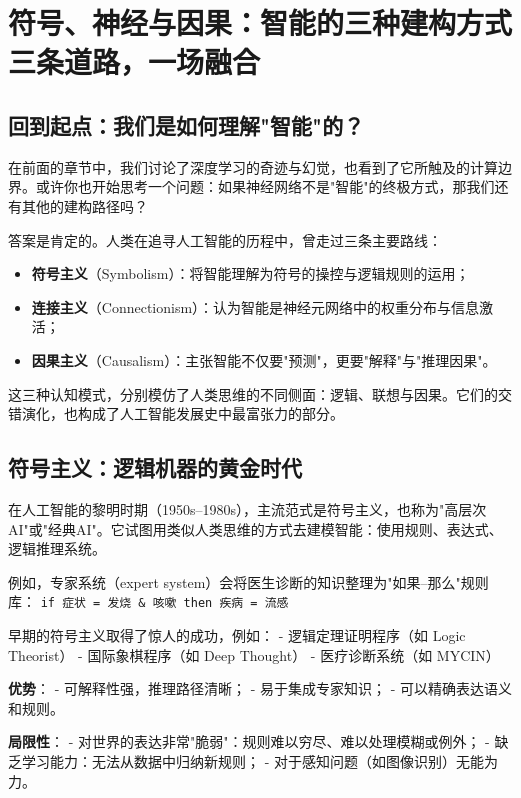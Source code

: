 \chapter{符号、神经与因果：智能的三种建构方式 \texorpdfstring{\\}{ } 三条道路，一场融合}
\section*{回到起点：我们是如何理解"智能"的？}

在前面的章节中，我们讨论了深度学习的奇迹与幻觉，也看到了它所触及的计算边界。或许你也开始思考一个问题：如果神经网络不是"智能"的终极方式，那我们还有其他的建构路径吗？

答案是肯定的。人类在追寻人工智能的历程中，曾走过三条主要路线：
\begin{itemize}
\item \textbf{符号主义}（Symbolism）：将智能理解为符号的操控与逻辑规则的运用；
\item \textbf{连接主义}（Connectionism）：认为智能是神经元网络中的权重分布与信息激活；
\item \textbf{因果主义}（Causalism）：主张智能不仅要"预测"，更要"解释"与"推理因果"。
\end{itemize}

这三种认知模式，分别模仿了人类思维的不同侧面：逻辑、联想与因果。它们的交错演化，也构成了人工智能发展史中最富张力的部分。

\section*{符号主义：逻辑机器的黄金时代}

在人工智能的黎明时期（1950s–1980s），主流范式是符号主义，也称为"高层次AI"或"经典AI"。它试图用类似人类思维的方式去建模智能：使用规则、表达式、逻辑推理系统。

例如，专家系统（expert system）会将医生诊断的知识整理为"如果–那么"规则库：
\texttt{if 症状 = 发烧 \& 咳嗽 then 疾病 = 流感}

早期的符号主义取得了惊人的成功，例如：
- 逻辑定理证明程序（如 Logic Theorist）
- 国际象棋程序（如 Deep Thought）
- 医疗诊断系统（如 MYCIN）

\textbf{优势}：
- 可解释性强，推理路径清晰；
- 易于集成专家知识；
- 可以精确表达语义和规则。

\textbf{局限性}：
- 对世界的表达非常"脆弱"：规则难以穷尽、难以处理模糊或例外；
- 缺乏学习能力：无法从数据中归纳新规则；
- 对于感知问题（如图像识别）无能为力。


